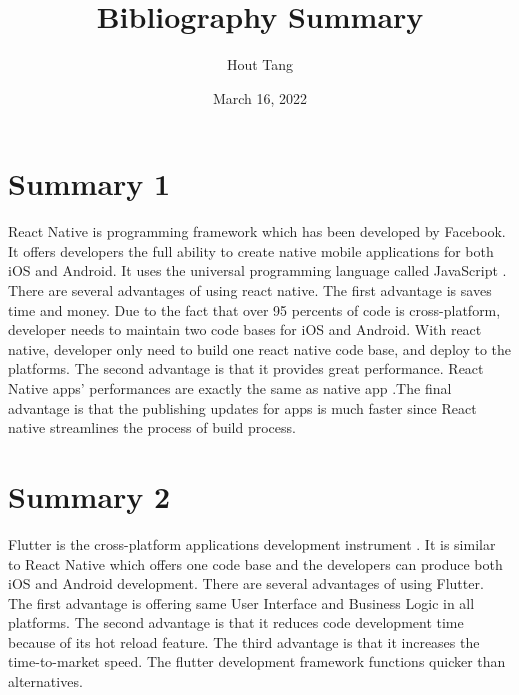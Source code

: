 \documentclass{article}
\title{Bibliography Summary}
\author{Hout Tang}
\date{March 16, 2022}
\begin{document}
\maketitle

\section*{Summary 1}


React Native is programming framework which has been developed by Facebook. It offers developers the full ability to create native mobile applications for both iOS and Android. It uses the universal programming language called JavaScript \cite{BetsolArticle}. There are several advantages of using react native. The first advantage is saves time and money. Due to the fact that over 95 percents of code is cross-platform, developer needs to maintain two code bases for iOS and Android. With react native, developer only need to build one react native code base, and deploy to the platforms. The second advantage is that it provides great performance. React Native apps' performances are exactly the same as native app \cite{clearTeachArticle}.The final advantage is that the publishing updates for apps is much faster since React native streamlines the process of build process. 


\medskip

\section*{Summary 2}

Flutter is the cross-platform applications development instrument \cite{AnnaDziubaArticle}. It is similar to React Native which offers one code base and the developers can produce both iOS and Android development. There are several advantages of using Flutter. The first advantage is offering same User Interface and Business Logic in all platforms. The second advantage is that it reduces code development time because of its hot reload feature. The third advantage is that it increases the time-to-market speed. The flutter development framework functions quicker than alternatives. \cite{AnnaDziubaArticle}


\printbibliography
\end{document}

